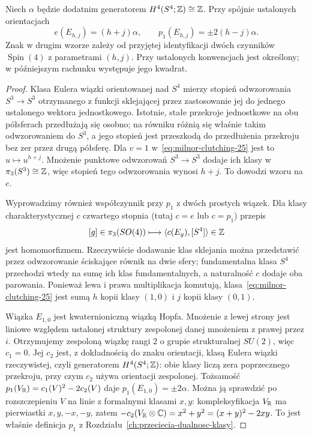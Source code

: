 \begin{samepage}
\begin{stwierdzenie}
\label{prop:milnor-classes-25}
Niech $\alpha$ będzie dodatnim generatorem
$H^4(S^4;\mathbb{Z})\cong\mathbb{Z}$. Przy spójnie
ustalonych orientacjach
\[
 e(E_{h,j})=(h+j)\alpha,\qquad
 p_1(E_{h,j})=\pm2(h-j)\alpha.
\]
Znak w drugim wzorze zależy od przyjętej
identyfikacji dwóch czynników $\operatorname{Spin}(4)$
z parametrami $(h,j)$. Przy ustalonych konwencjach
jest określony; w późniejszym rachunku
występuje jego kwadrat.
\end{stwierdzenie}
\end{samepage}
\begin{proof}
Klasa Eulera wiązki orientowanej
nad $S^4$ mierzy stopień
odwzorowania $S^3\to S^3$
otrzymanego z funkcji sklejającej
przez zastosowanie jej do jednego
ustalonego wektora jednostkowego.
Istotnie, stałe przekroje jednostkowe
na obu półsferach przedłużają się osobno;
na równiku różnią się właśnie takim
odwzorowaniem do $S^3$, a jego stopień
jest przeszkodą do przedłużenia
przekroju bez zer przez drugą półsferę.
Dla $v=1$ w~\eqref{eq:milnor-clutching-25}
jest to $u\mapsto u^{h+j}$.
Mnożenie punktowe odwzorowań
$S^3\to S^3$ dodaje ich klasy
w $\pi_3(S^3)\cong\mathbb{Z}$, więc stopień
tego odwzorowania wynosi $h+j$.
To dowodzi wzoru na $e$.

Wyprowadzimy również współczynnik przy $p_1$
z dwóch prostych wiązek. Dla klasy
charakterystycznej $c$ czwartego stopnia
(tutaj $c=e$ lub $c=p_1$)
przepis
\[
 [g]\in\pi_3(SO(4))\longmapsto
 \langle c(E_g),[S^4]\rangle\in\mathbb{Z}
\]
jest homomorfizmem. Rzeczywiście dodawanie
klas sklejania można przedstawić przez
odwzorowanie ściskające równik na dwie sfery;
fundamentalna klasa $S^4$ przechodzi wtedy
na sumę ich klas fundamentalnych, a
naturalność $c$ dodaje oba parowania.
Ponieważ lewa i prawa multiplikacja
komutują, klasa~\eqref{eq:milnor-clutching-25}
jest sumą $h$ kopii klasy $(1,0)$
i $j$ kopii klasy $(0,1)$.

Wiązka $E_{1,0}$ jest kwaternioniczną
wiązką Hopfa. Mnożenie z lewej strony
jest liniowe względem ustalonej struktury
zespolonej danej mnożeniem z prawej przez $i$.
Otrzymujemy zespoloną wiązkę rangi $2$
o grupie strukturalnej $SU(2)$, więc $c_1=0$.
Jej $c_2$ jest, z dokładnością do znaku
orientacji, klasą Eulera wiązki rzeczywistej,
czyli generatorem $H^4(S^4;\mathbb{Z})$:
obie klasy liczą zera poprzecznego przekroju,
przy czym $c_2$ używa orientacji zespolonej.
Tożsamość
$p_1(V_{\mathbb{R}})=c_1(V)^2-2c_2(V)$
daje $p_1(E_{1,0})=\pm2\alpha$.
Można ją sprawdzić po rozszczepieniu
$V$ na linie z formalnymi klasami
$x,y$: kompleksyfikacja $V_{\mathbb{R}}$
ma pierwiastki $x,y,-x,-y$, zatem
$-c_2(V_{\mathbb{R}}\otimes\mathbb{C})=x^2+y^2
=(x+y)^2-2xy$. To jest właśnie
definicja $p_1$ z
Rozdziału~\ref{ch:przeciecia-dualnosc-klasy}.


\end{proof}
